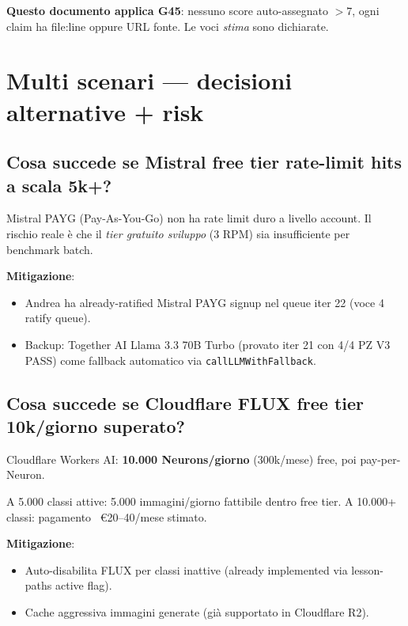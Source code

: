 \documentclass[12pt,a4paper]{article}
\begin{document}
\textbf{Questo documento applica G45}: nessuno score auto-assegnato $> 7$, ogni claim ha file:line oppure URL fonte. Le voci \emph{stima} sono dichiarate.

\newpage

\section{Multi scenari --- decisioni alternative + risk}

\subsection{Cosa succede se Mistral free tier rate-limit hits a scala 5k+?}

Mistral PAYG (Pay-As-You-Go) non ha rate limit duro a livello account. Il rischio reale è che il \emph{tier gratuito sviluppo} (3 RPM) sia insufficiente per benchmark batch.

\textbf{Mitigazione}:
\begin{itemize}
  \item Andrea ha already-ratified Mistral PAYG signup nel queue iter 22 (voce 4 ratify queue).
  \item Backup: Together AI Llama 3.3 70B Turbo (provato iter 21 con 4/4 PZ V3 PASS) come fallback automatico via \texttt{callLLMWithFallback}.
\end{itemize}

\subsection{Cosa succede se Cloudflare FLUX free tier 10k/giorno superato?}

Cloudflare Workers AI: \textbf{10.000 Neurons/giorno} (300k/mese) free, poi pay-per-Neuron.

A 5.000 classi attive: 5.000 immagini/giorno fattibile dentro free tier. A 10.000+ classi: pagamento ~€20--40/mese stimato.

\textbf{Mitigazione}:
\begin{itemize}
  \item Auto-disabilita FLUX per classi inattive (already implemented via lesson-paths active flag).
  \item Cache aggressiva immagini generate (già supportato in Cloudflare R2).
\end{itemize}
\end{document}
